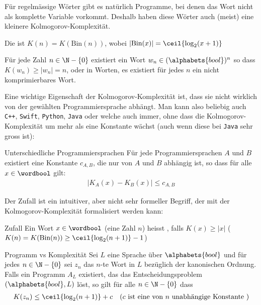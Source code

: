 \proven


Für regelmässige Wörter gibt es natürlich Programme, bei denen das Wort nicht als komplette Variable vorkommt.
Deshalb haben diese Wörter auch (meist) eine kleinere Kolmogorov-Komplexität.


 Die  ist $K(n) = K(\text{Bin}(n))$,
wobei $|\text{Bin}(x)| = \ceil{\log_2(x + 1)}$

\inlinelemma Für jede Zahl $n \in \N - \{ 0 \}$ existiert ein Wort $w_n \in (\alphabets{bool})^n$ so dass $K(w_n) \geq |w_n| = n$, oder in Worten, es existiert für jedes $n$ ein nicht komprimierbares Wort.

Eine wichtige Eigenschaft der Kolmogorov-Komplexität ist, dass sie nicht wirklich von der gewählten Programmiersprache abhängt.
Man kann also beliebig auch \texttt{C++}, \texttt{Swift}, \texttt{Python}, \texttt{Java} oder welche auch immer, ohne dass die Kolmogorov-Komplexität um mehr als eine Konstante wächst (auch wenn diese bei \texttt{Java} sehr gross ist):

\begin{theorem}[]{Unterschiedliche Programmiersprachen}
	Für jede Programmiersprachen $A$ und $B$ existiert eine Konstante $c_{A,B}$, die nur von $A$ und $B$ abhängig ist, so dass für alle $x \in \wordbool$ gilt:
	\begin{align*}
		|K_A(x) - K_B(x)| \leq c_{A, B}
	\end{align*}
\end{theorem}


 Der Zufall ist ein intuitiver, aber nicht sehr formeller Begriff, der mit der Kolmogorov-Komplexität formalisiert werden kann:
\begin{definition}[]{Zufall}
    Ein Wort $x \in \wordbool$ (eine Zahl $n$) heisst , falls $K(x) \geq |x|$ ($K(n) = K(\text{Bin}(n)) \geq \ceil{\log_2(n + 1)} - 1$)
\end{definition}

\begin{theorem}[]{Programm vs Komplexität}
    Sei $L$ eine Sprache über $\alphabets{bool}$ und für jedes $n \in \N - \{0\}$ sei $z_n$ das $n$-te Wort in $L$ bezüglich der kanonischen Ordnung.
    Falls ein Programm $A_L$ existiert, das das Entscheidungsproblem $(\alphabets{bool}, L)$ löst, so gilt für alle $n \in \N - \{ 0 \}$ dass
    \begin{align*}
        K(z_n) \leq \ceil{\log_2(n + 1)} + c & & (c \text{ ist eine von } n \text{ unabhängige Konstante })
    \end{align*}
\end{theorem}

